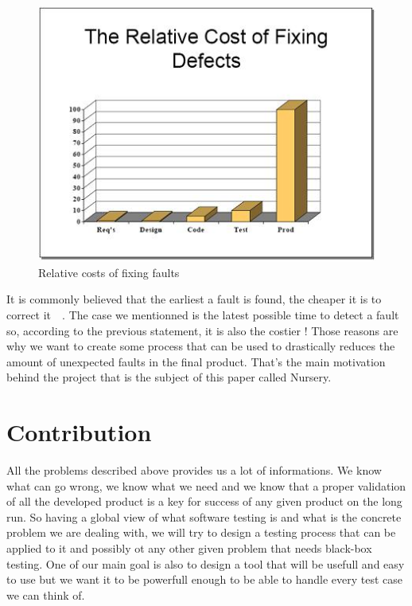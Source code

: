 \documentclass[12pt]{article}
\begin{document}
\begin{figure}
    \centering
    \includegraphics[scale=0.8]{STBC-costfixs.jpg}
    \caption{Relative costs of fixing faults~\cite{EconomicsSTBC:2017}}
    \label{STBC-costfixs}
\end{figure}

It is commonly believed that the earliest a fault is found, the cheaper it is to correct it~\cite{EconomicsSTBC:2017}~\cite{EconomicsWiki:2017}. The case we mentionned is the latest possible time to detect a fault so, according to the previous statement, it is also the costier ! Those reasons are why we want to create some process that can be used to drastically reduces the amount of unexpected faults in the final product. That's the main motivation behind the project that is the subject of this paper called Nursery.\\



\clearpage
\part{Contribution}

All the problems described above provides us a lot of informations. We know what can go wrong, we know what we need and we know that a proper validation of all the developed product is a key for success of any given product on the long run. So having a global view of what software testing is and what is the concrete problem we are dealing with, we will try to design a testing process that can be applied to it and possibly ot any other given problem that needs black-box testing. One of our main goal is also to design a tool that will be usefull and easy to use but we want it to be powerfull enough to be able to handle every test case we can think of.\\
\end{document}
